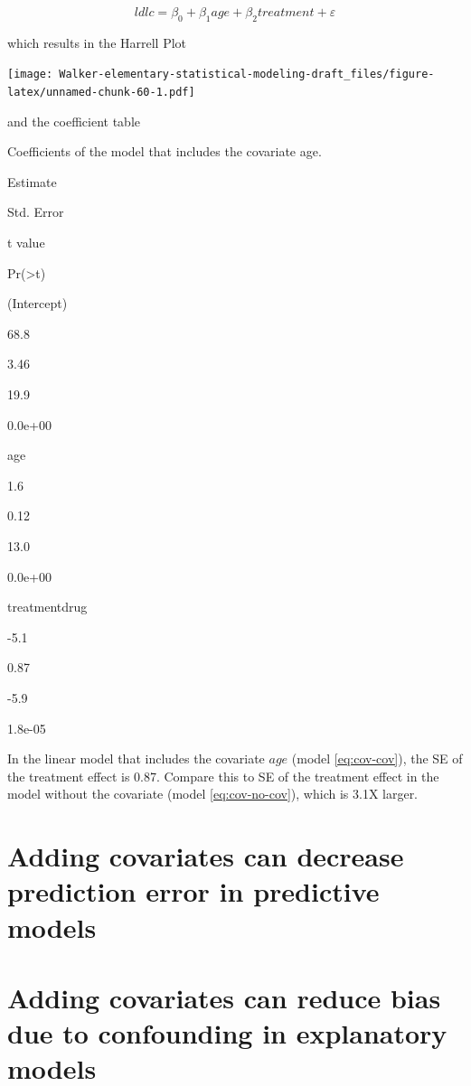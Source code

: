\documentclass[]{book}
\begin{document}
\begin{equation}
ldlc = \beta_0 + \beta_1 age + \beta_2 treatment + \varepsilon
\label{eq:cov-cov}
\end{equation}

which results in the Harrell Plot

\texttt{[image: Walker-elementary-statistical-modeling-draft\_files/figure-latex/unnamed-chunk-60-1.pdf]}

and the coefficient table

\label{tab:unnamed-chunk-61}Coefficients of the model that includes the
covariate age.

Estimate

Std. Error

t value

Pr(\textgreater{}\textbar{}t\textbar{})

(Intercept)

68.8

3.46

19.9

0.0e+00

age

1.6

0.12

13.0

0.0e+00

treatmentdrug

-5.1

0.87

-5.9

1.8e-05

In the linear model that includes the covariate \(age\) (model
\eqref{eq:cov-cov}), the SE of the treatment effect is 0.87. Compare this
to SE of the treatment effect in the model without the covariate (model
\eqref{eq:cov-no-cov}), which is 3.1X larger.

\section{Adding covariates can decrease prediction error in predictive
models}\label{adding-covariates-can-decrease-prediction-error-in-predictive-models}

\section{Adding covariates can reduce bias due to confounding in
explanatory
models}\label{adding-covariates-can-reduce-bias-due-to-confounding-in-explanatory-models}
\end{document}
